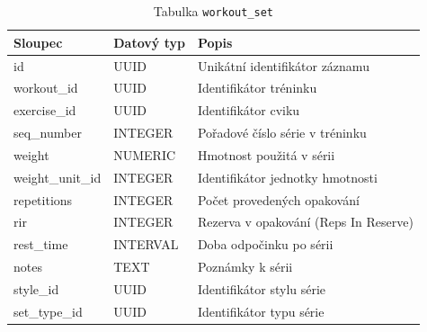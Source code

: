 \begin{table}[ht!]
    \centering
    \begin{tabularx}{\textwidth}{|l|l|L|}
        \hline
        \textbf{Sloupec} & \textbf{Datový typ} & \textbf{Popis}                        \\ \hline
        id               & UUID                & Unikátní identifikátor záznamu        \\ \hline
        workout\_id      & UUID                & Identifikátor tréninku                \\ \hline
        exercise\_id     & UUID                & Identifikátor cviku                   \\ \hline
        seq\_number      & INTEGER             & Pořadové číslo série v tréninku       \\ \hline
        weight           & NUMERIC             & Hmotnost použitá v sérii              \\ \hline
        weight\_unit\_id & INTEGER             & Identifikátor jednotky hmotnosti      \\ \hline
        repetitions      & INTEGER             & Počet provedených opakování           \\ \hline
        rir              & INTEGER             & Rezerva v opakování (Reps In Reserve) \\ \hline
        rest\_time       & INTERVAL            & Doba odpočinku po sérii               \\ \hline
        notes            & TEXT                & Poznámky k sérii                      \\ \hline
        style\_id        & UUID                & Identifikátor stylu série             \\ \hline
        set\_type\_id    & UUID                & Identifikátor typu série              \\ \hline
    \end{tabularx}
    \caption{Tabulka \texttt{workout\_set}}
    \label{tab:workout_set}
\end{table}
